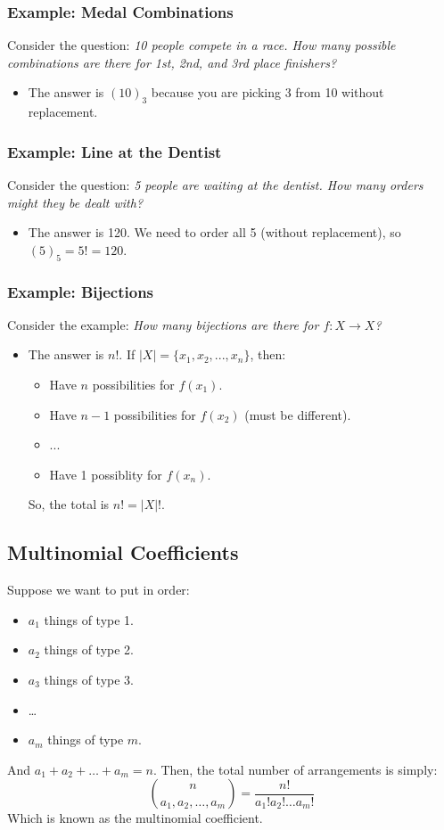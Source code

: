 \documentclass[letterpaper]{article}
\begin{document}
\subsubsection{Example: Medal Combinations}
Consider the question: \emph{10 people compete in a race. How many possible combinations are there for 1st, 2nd, and 3rd place finishers?} 

\begin{itemize}
    \item The answer is $(10)_3$ because you are picking 3 from 10 without replacement.
\end{itemize}

\subsubsection{Example: Line at the Dentist}
Consider the question: \emph{5 people are waiting at the dentist. How many orders might they be dealt with?} 

\begin{itemize}
    \item The answer is 120. We need to order all 5 (without replacement), so $(5)_5 = 5! = 120$.
\end{itemize}

\subsubsection*{Example: Bijections}
Consider the example: \emph{How many bijections are there for $f: X \to X$?} 

\begin{itemize}
    \item The answer is $n!$. If $|X| = \{x_1, x_2, ..., x_n\}$, then:
    \begin{itemize}
        \item Have $n$ possibilities for $f(x_1)$.
        \item Have $n - 1$ possibilities for $f(x_2)$ (must be different).
        \item ... 
        \item Have 1 possiblity for $f(x_n)$.
    \end{itemize}
    So, the total is $n! = |X|!$. 
\end{itemize}

\subsection{Multinomial Coefficients}
Suppose we want to put in order:
\begin{itemize}
    \item $a_1$ things of type 1.
    \item $a_2$ things of type 2.
    \item $a_3$ things of type 3. 
    \item \dots
    \item $a_m$ things of type $m$.
\end{itemize}
And $a_1 + a_2 + \dots + a_m = n$. Then, the total number of arrangements is simply:
\[\binom{n}{a_1, a_2, \dots, a_m} = \frac{n!}{a_{1}!a_{2}! \dots a_{m}!}\]
Which is known as the multinomial coefficient.
\end{document}
